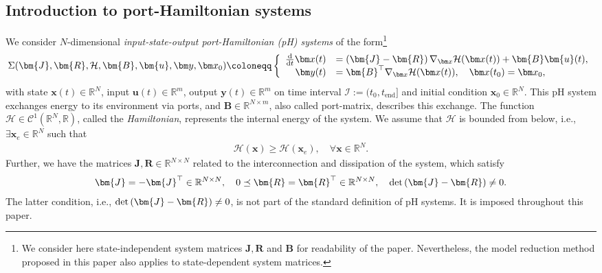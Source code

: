 \documentclass{article}
\newcommand{\R}{\mathbb{R}}
\newcommand{\curlyH}{\mathcal{H}}
\newcommand{\DivHamFOM}{\nabla_{\statex}\curlyH(\statex(t))}
\newcommand{\statex}{{\bm x}}
\newcommand{\outputy}{{\bm y}}
\newcommand{\statexT}{\statex(t)}
\newcommand{\outputyT}{\outputy(t)}
\newcommand{\inputu}{\bm{u}}
\newcommand{\ddt}{\frac{\rm d}{{\rm d} t}}
\newcommand{\SysLable}{\Sigma}
\newcommand{\portsize}{m}
\newcommand{\FOMsize}{N}
\newcommand{\funcJ}{\bm{J}}
\newcommand{\funcR}{\bm{R}}
\newcommand{\funcB}{\bm{B}}
\newcommand{\pH}{\textsf{pH}\xspace}
\renewcommand{\emph}[1]{\textit{#1}}
\begin{document}
	\subsection{Introduction to port-Hamiltonian systems}\label{subsec:pH_intro}
	
	We consider $\FOMsize$-dimensional \emph{input-state-output port-Hamiltonian (\pH) systems} of the form\footnote{We consider here state-independent system matrices $\funcJ, \funcR$ and $\funcB$ for readability of the paper. Nevertheless, the model reduction method proposed in this paper also applies to state-dependent system matrices.} 
	\begin{align}
		\label{equ:Nonlinear_FOM_pH}
		\SysLable(\funcJ,\funcR,\curlyH,\funcB, \inputu,\outputy,\statex_0)\coloneqq
		\left\{
		\begin{array}{rl}
			\ddt \statexT &=\left(\funcJ-\funcR\right)
			\DivHamFOM
			+\funcB \inputu(t),
			\\
			\outputyT &=\funcB^{\top}\DivHamFOM,
			\quad \statex(t_0) = \statex_0,
		\end{array}
		\right.
	\end{align}
	with state $\statex(t) \in \R^{\FOMsize}$, input $\inputu(t) \in \R^{\portsize}$, output $\outputy(t) \in \R^{\portsize}$ on time interval $\mathcal{I}:=(t_0,t_{\text{end}}]$ and initial condition $\statex_0\in\R^{\FOMsize}$. 
	This \pH system exchanges energy to its environment via ports, and $\funcB \in \R^{\FOMsize\times \portsize}$, also called port-matrix, describes this exchange. 
	The function $ \curlyH \in \mathcal{C}^{1}(\R^{\FOMsize}, \R)$, called the \emph{Hamiltonian}, represents the internal energy of the system. We assume that $\curlyH$ is bounded from below, i.e., $\exists \statex_e\in\R^{\FOMsize}$ such that  
	\begin{align*} 
		\curlyH(\statex) \geq \curlyH(\statex_e), \quad \forall
		\statex \in \R^{\FOMsize}.
	\end{align*}
	Further, we have the matrices $\funcJ,\funcR \in \R^{\FOMsize\times \FOMsize}$ related to the interconnection and dissipation of the system, which satisfy
	\begin{align*}
		\funcJ = -\funcJ^{\top} \in \R^{\FOMsize\times \FOMsize},\quad
		0\preceq \funcR = \funcR^{\top} \in \R^{\FOMsize\times \FOMsize},\quad
		{\rm det}\left(\funcJ-\funcR\right)\neq 0.
	\end{align*} 
	The latter condition, i.e.,  ${\rm det}\left(\funcJ-\funcR\right)\neq 0$, is not part of the standard definition of \pH systems. It is imposed throughout this paper. 
\end{document}
